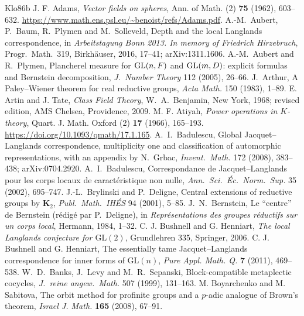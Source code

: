 \begin{thebibliography}{Klo86b}\small
{} J. F. Adams, \emph{Vector fields on spheres}, Ann. of Math. (2) \textbf{75} (1962), 603--632. \url{https://www.math.ens.psl.eu/~benoist/refs/Adams.pdf}.
 A.-M.~Aubert, P.~Baum, R.~Plymen and M.~Solleveld, Depth and the local Langlands correspondence, in \emph{Arbeitstagung Bonn 2013. In memory of Friedrich Hirzebruch}, Progr.\ Math.\ 319, Birkh\"auser, 2016, 17--41; arXiv:1311.1606.
 A.-M.~Aubert and R.~Plymen, Plancherel measure for $\mathrm{GL}(n,F)$ and $\mathrm{GL}(m,D)$: explicit formulas and Bernstein decomposition, \emph{J.\ Number Theory} 112 (2005), 26--66.
 J.~Arthur, A Paley--Wiener theorem for real reductive groups, \emph{Acta Math.} 150 (1983), 1--89.
 E. Artin and J. Tate, \emph{Class Field Theory}, W.~A.~Benjamin, New York, 1968; revised edition, AMS Chelsea, Providence, 2009.
 M. F. Atiyah, \emph{Power operations in $K$-theory}, Quart. J. Math. Oxford (2) \textbf{17} (1966), 165--193. \url{https://doi.org/10.1093/qmath/17.1.165}.
 A.~I.~Badulescu, Global Jacquet--Langlands correspondence, multiplicity one and classification of automorphic representations, with an appendix by N.~Grbac, \emph{Invent.\ Math.} 172 (2008), 383--438; arXiv:0704.2920.
 A.~I.~Badulescu, Correspondance de Jacquet--Langlands pour les corps locaux de caract\'eristique non nulle, \emph{Ann.\ Sci.\ \'Ec.\ Norm.\ Sup.} 35 (2002), 695--747.
 J.-L.~Brylinski and P.~Deligne, Central extensions of reductive groups by $\mathbf K_2$, \emph{Publ.\ Math.\ IH\'ES} 94 (2001), 5--85.
 J.~N.~Bernstein, Le ``centre'' de Bernstein (r\'edig\'e par P.~Deligne), in \emph{Repr\'esentations des groupes r\'eductifs sur un corps local}, Hermann, 1984, 1--32.
 C. J. Bushnell and G. Henniart, \emph{The local Langlands conjecture for $\mathrm{GL}(2)$}, Grundlehren 335, Springer, 2006.
 C. J. Bushnell and G. Henniart, The essentially tame Jacquet--Langlands correspondence for inner forms of $\mathrm{GL}(n)$, \emph{Pure Appl. Math. Q.} \textbf{7} (2011), 469--538.
 W.~D.~Banks, J.~Levy and M.~R.~Sepanski, Block-compatible metaplectic cocycles, \emph{J.\ reine angew.\ Math.} 507 (1999), 131--163.
 M. Boyarchenko and M. Sabitova, The orbit method for profinite groups and a $p$-adic analogue of Brown's theorem, \emph{Israel J. Math.} \textbf{165} (2008), 67--91.

\end{thebibliography}
